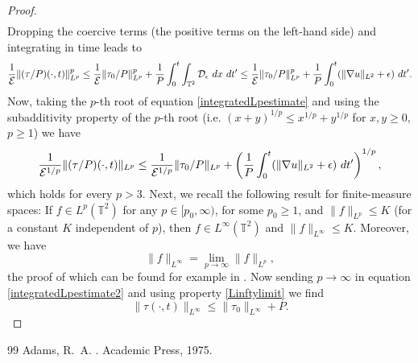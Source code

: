 \documentclass[10pt,a4paper]{amsart}
\newcommand{\dt}{\ {\rm d} t }
\newcommand{\dx}{\ {\rm d} {x}}
\begin{document}
\begin{proof}
\begin{align*}
\end{align*}
Dropping the coercive terms (the positive terms on the left-hand side) and integrating in time leads to
\begin{align}
\dfrac{1}{\mathcal E} \lVert (\tau / P) (\cdot, t) \rVert_{L^p}^p \leq \dfrac{1}{\mathcal E} \lVert \tau_0 / P \rVert_{L^p}^p + \frac{1}{P} \int_0^t \int_{\mathbb{T}^2} \mathcal{D}_\epsilon \dx \dt' \leq \dfrac{1}{\mathcal E} \lVert \tau_0 / P \rVert_{L^p}^p + \frac{1}{P} \int_0^t (\lVert \nabla u \rVert_{L^2} + \epsilon) \dt' \label{integratedLpestimate}.
\end{align}
Now, taking the $p$-th root of equation \eqref{integratedLpestimate} and using the subadditivity property of the $p$-th root (i.e. $(x + y)^{1/p} \leq x^{1/p} + y^{1/p}$ for $x,y \geq 0$, $ p \geq 1 $) we have
\begin{equation} \label{integratedLpestimate2}
\dfrac{1}{\mathcal{E}^{1/p}} \lVert (\tau / P) (\cdot, t) \rVert_{L^p} \leq \dfrac{1}{\mathcal{E}^{1/p}} \lVert \tau_0 / P \rVert_{L^p} + \left( \frac{1}{P} \int_0^t (\lVert \nabla u \rVert_{L^2} + \epsilon) \dt' \right)^{1/p},
\end{equation}
which holds for every $p > 3$. Next, we recall the following result for finite-measure spaces: If $f \in L^p (\mathbb{T}^2)$ for any $p \in [p_0,\infty)$, for some $p_0 \geq 1$, and $\lVert f \rVert_{L^p} \leq K$ (for a constant $K$ independent of $p$), then $f \in L^\infty (\mathbb{T}^2)$ and $\lVert f \rVert_{L^\infty} \leq K$. Moreover, we have
\begin{equation} \label{Linftylimit}
\lVert f \rVert_{L^\infty} = \lim_{p \rightarrow \infty} \lVert f \rVert_{L^p},
\end{equation}
the proof of which can be found for example in \cite[Theorem 2.8]{adams}. 
Now sending $p \rightarrow \infty$ in equation \eqref{integratedLpestimate2} and using property \eqref{Linftylimit} we find
\begin{equation}
\lVert \tau (\cdot, t) \rVert_{L^\infty} \leq \lVert \tau_0 \rVert_{L^\infty} + P.
\end{equation}
\end{proof}

\begin{thebibliography}{99}
 {\sc Adams, R.~A.} . \newblock Academic Press, 1975.
\end{thebibliography}
\end{document}
